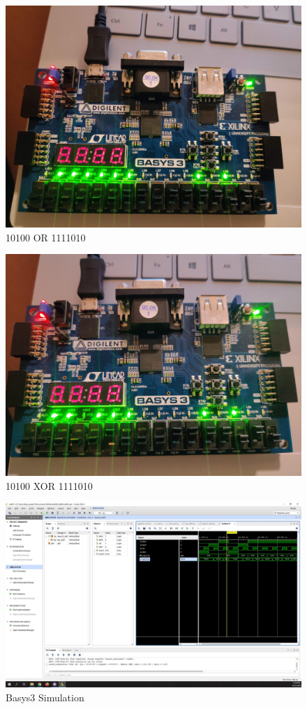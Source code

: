 \documentclass[11pt]{article}
\begin{document}
\begin{figure}[ht]\centering
	\includegraphics[width=.5\textwidth]{board5}
	\caption{10100 OR 1111010}
	\label{fig:b3_5}			
\end{figure}

\begin{figure}[ht]\centering
	\includegraphics[width=.5\textwidth]{board6}
	\caption{10100 XOR 1111010}
	\label{fig:b3_6}			
\end{figure}

\begin{figure}[ht] \centering	
	\includegraphics[width=1\textwidth,trim=21cm 19cm 0cm 6cm,clip]{basys3_sim_scrn}
	\caption{Basys3 Simulation}
	\label{fig:img3}
\end{figure}
\end{document}
